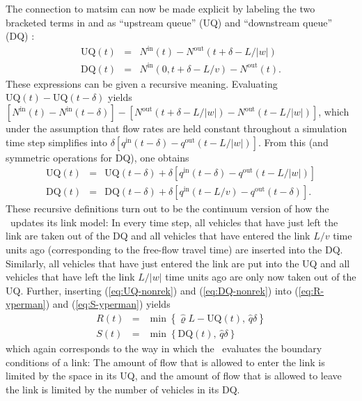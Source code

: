 The connection to \gls{matsim} can now be made explicit by labeling the
two bracketed terms in  and 
as {}``upstream queue'' (UQ) and {}``downstream queue'' (DQ) \citep{osorio-2011a,osorio-2013b}:
\begin{eqnarray}
\text{UQ}(t) & = & N^{\text{in}}(t)-N^{\text{out}}(t+\delta-L/|w|)\label{eq:UQ-nonrek}\\
\text{DQ}(t) & = & N^{\text{in}}(0,t+\delta-L/v)-N^{\text{out}}(t)\label{eq:DQ-nonrek}.
\end{eqnarray}
These expressions can be given a recursive meaning. Evaluating
$\text{UQ}(t) - \text{UQ}(t - \delta)$ yields 
$[N^{\text{in}}(t) - N^{\text{in}}(t-\delta)] - [N^{\text{out}}(t+\delta-L/|w|) - N^{\text{out}}(t-L/|w|) ]$,
which under the assumption that flow rates are held constant throughout a simulation time step
simplifies into $\delta [ q^{\text{in}}(t-\delta) - q^{\text{out}}(t-L/|w|) ]$.
From this (and symmetric operations for DQ), one obtains
\begin{eqnarray}
\text{UQ}(t) & = & \text{UQ}(t-\delta)+\delta\left[q^{\text{in}}(t-\delta)-q^{\text{out}}(t-L/|w|)\right]\label{eq:UQ-rek}\\
\text{DQ}(t) & = & \text{DQ}(t-\delta)+\delta\left[q^{\text{in}}(t-L/v)-q^{\text{out}}(t-\delta)\right].\label{eq:DQ-rek}
\end{eqnarray}
These recursive definitions turn out to be the continuum version of
how the \DOUBLEQUEUESIM\ updates its link model: In
every time step, all vehicles that have just left the link are taken
out of the DQ and all vehicles that have entered the link $L/v$ time
units ago (corresponding to the free-flow travel time) are inserted
into the DQ. Similarly, all vehicles that have just entered the link
are put into the UQ and all vehicles that have left the link $L/|w|$
time units ago are only now taken out of the UQ. Further, inserting
(\ref{eq:UQ-nonrek}) and (\ref{eq:DQ-nonrek}) into (\ref{eq:R-yperman})
and (\ref{eq:S-yperman}) yields
\begin{eqnarray}
R(t) & = & \min\left\{ \hat{\varrho}L-\text{UQ}(t),\,\hat{q}\delta\right\} \label{eq:R-matsim}\\
S(t) & = & \min\left\{ \text{DQ}(t),\,\hat{q}\delta\right\} \label{eq:S-matsim}
\end{eqnarray}
which again corresponds to the way in which the \DOUBLEQUEUESIM\ 
evaluates the boundary conditions of a link: The amount of flow that
is allowed to enter the link is limited by the space in its UQ, and
the amount of flow that is allowed to leave the link is limited by the
number of vehicles in its DQ. 

